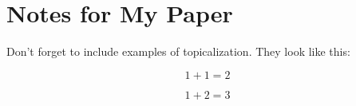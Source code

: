 \documentclass[12pt]{article}
\begin{document}
\section*{Notes for My Paper}

Don't forget to include examples of topicalization.
They look like this:

$$
 1 + 1 = 2
$$

\[
 1 + 2 = 3
\]
\end{document}

